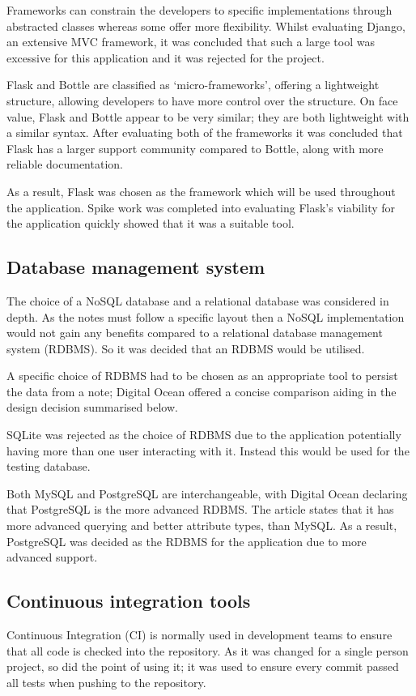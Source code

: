Frameworks can constrain the developers to specific implementations through abstracted classes whereas some offer more flexibility. Whilst evaluating Django, an extensive MVC framework, it was concluded that such a large tool was excessive for this application and it was rejected for the project.

Flask and Bottle are classified as `micro-frameworks', offering a lightweight structure, allowing developers to have more control over the structure. On face value, Flask and Bottle appear to be very similar; they are both lightweight with a similar syntax. After evaluating both of the frameworks it was concluded that Flask has a larger support community compared to Bottle, along with more reliable documentation.

As a result, Flask was chosen as the framework which will be used throughout the application. Spike work was completed into evaluating Flask's viability for the application quickly showed that it was a suitable tool.

\subsection{Database management system} \label{section:database}
The choice of a NoSQL database and a relational database was considered in depth. As the notes must follow a specific layout then a NoSQL implementation would not gain any benefits compared to a relational database management system (RDBMS). So it was decided that an RDBMS would be utilised.

A specific choice of RDBMS had to be chosen as an appropriate tool to persist the data from a note; Digital Ocean offered a concise comparison aiding in the design decision \cite{citeulike:14019772} summarised below.

SQLite \cite{citeulike:14027309} was rejected as the choice of RDBMS due to the application potentially having more than one user interacting with it. Instead this would be used for the testing database.

Both MySQL \cite{citeulike:14027308} and PostgreSQL \cite{citeulike:1351635} are interchangeable, with Digital Ocean declaring that PostgreSQL is the more advanced RDBMS. The article states that it has more advanced querying and better attribute types, than MySQL. As a result, PostgreSQL was decided as the RDBMS for the application due to more advanced support.

\subsection{Continuous integration tools} \label{tools:CI}
Continuous Integration (CI) is normally used in development teams to ensure that all code is checked into the repository. As it was changed for a single person project, so did the point of using it; it was used to ensure every commit passed all tests when pushing to the repository.

